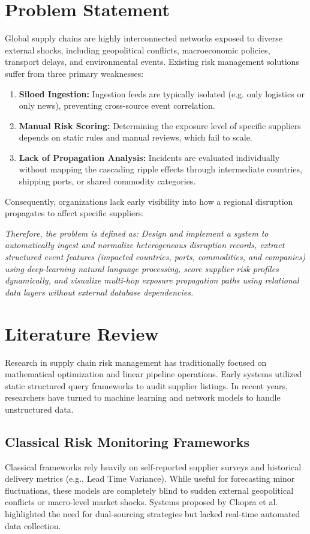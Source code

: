 \documentclass[12pt]{report}
\begin{document}
\section{Problem Statement}
Global supply chains are highly interconnected networks exposed to diverse external shocks, including geopolitical conflicts, macroeconomic policies, transport delays, and environmental events. Existing risk management solutions suffer from three primary weaknesses:
\begin{enumerate}
  \item \textbf{Siloed Ingestion:} Ingestion feeds are typically isolated (e.g. only logistics or only news), preventing cross-source event correlation.
  \item \textbf{Manual Risk Scoring:} Determining the exposure level of specific suppliers depends on static rules and manual reviews, which fail to scale.
  \item \textbf{Lack of Propagation Analysis:} Incidents are evaluated individually without mapping the cascading ripple effects through intermediate countries, shipping ports, or shared commodity categories.
\end{enumerate}
Consequently, organizations lack early visibility into how a regional disruption propagates to affect specific suppliers.

\textit{Therefore, the problem is defined as: Design and implement a system to automatically ingest and normalize heterogeneous disruption records, extract structured event features (impacted countries, ports, commodities, and companies) using deep-learning natural language processing, score supplier risk profiles dynamically, and visualize multi-hop exposure propagation paths using relational data layers without external database dependencies.}

\newpage
\section{Literature Review}
Research in supply chain risk management has traditionally focused on mathematical optimization and linear pipeline operations. Early systems utilized static structured query frameworks to audit supplier listings. In recent years, researchers have turned to machine learning and network models to handle unstructured data.

\subsection{Classical Risk Monitoring Frameworks}
Classical frameworks rely heavily on self-reported supplier surveys and historical delivery metrics (e.g., Lead Time Variance). While useful for forecasting minor fluctuations, these models are completely blind to sudden external geopolitical conflicts or macro-level market shocks. Systems proposed by Chopra et al. highlighted the need for dual-sourcing strategies but lacked real-time automated data collection. 
\end{document}
